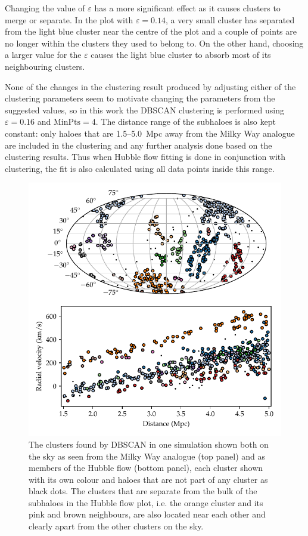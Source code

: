 \documentclass[english, oneside]{HYgradu}
\begin{document}
Changing the value of $\varepsilon$ has a more significant effect as it causes clusters to merge or separate. In the plot with $\varepsilon = 0.14$, a very small cluster has separated from the light blue cluster near the centre of the plot and a couple of points are no longer within the clusters they used to belong to. On the other hand, choosing a larger value for the $\varepsilon$ causes the light blue cluster to absorb most of its neighbouring clusters.

None of the changes in the clustering result produced by adjusting either of the clustering parameters seem to motivate changing the parameters from the suggested values, so in this work the DBSCAN clustering is performed using $\varepsilon=0.16$ and $\mathrm{MinPts}=4$. The distance range of the subhaloes is also kept constant: only haloes that are 1.5--5.0~Mpc away from the Milky Way analogue are included in the clustering and any further analysis done based on the clustering results. Thus when Hubble flow fitting is done in conjunction with clustering, the  fit is also calculated using all data points inside this range.

\begin{figure}
    \centering
    \includegraphics{kuvat/mollweide+hubble.pdf}
    \caption{The clusters found by DBSCAN in one simulation shown both on the sky as seen from the Milky Way analogue (top panel) and as members of the Hubble flow (bottom panel), each cluster shown with its own colour and haloes that are not part of any cluster as black dots. The clusters that are separate from the bulk of the subhaloes in the Hubble flow plot, i.e. the orange cluster and its pink and brown neighbours, are also located near each other and clearly apart from the other clusters on the sky.}\label{fig:mollweide+hubble}
\end{figure}
\end{document}
